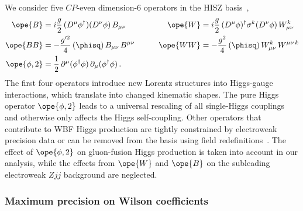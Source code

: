 We consider five $CP$-even dimension-6 operators in the HISZ
basis~\cite{hisz,higgs_fit},
%
\begin{alignat}{2}
  \ope{B}  &= i \frac{g}{2} \, (D^\mu\phi^\dagger) (D^\nu\phi) \, B_{\mu\nu} \quad & \quad
  \ope{W}  &= i \frac{g}{2} \, (D^\mu\phi)^\dagger \sigma^k ( D^\nu\phi) \, W_{\mu\nu}^k \notag \\
  \ope{BB}  &= -\frac{g'^2}{4}  \,  (\phisq) \, B_{\mu\nu} \, B^{\mu\nu} \quad & \quad
  \ope{WW}  &= -\frac{g^2}{4} \, (\phisq) \, W^k_{\mu\nu} \, W^{\mu\nu\, k} \notag \\
  \ope{\phi,2}  &= \frac{1}{2} \, \partial^\mu(\phi^\dagger\phi) \, \partial_\mu(\phi^\dagger\phi) \,.
\label{eq:wbf_ope}
\end{alignat}
%
The first four operators introduce new Lorentz structures into
Higgs-gauge interactions, which translate into changed kinematic
shapes.  The pure Higgs operator $\ope{\phi,2}$ leads to a universal
rescaling of all single-Higgs couplings and otherwise only affects the
Higgs self-coupling. Other operators that contribute to WBF Higgs
production are tightly constrained by electroweak precision data or
can be removed from the basis using field
redefinitions~\cite{power-to-the-data}.  The effect of $\ope{\phi,2}$
on gluon-fusion Higgs production is taken into account in our
analysis, while the effects from $\ope{W}$ and $\ope{B}$ on the
subleading electroweak $Zjj$ background are neglected.



\subsubsection*{Maximum precision on Wilson coefficients}

